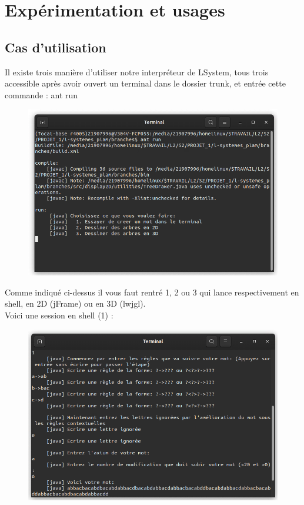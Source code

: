 \documentclass[a4paper,12pt]{article}
\begin{document}
\newpage
\section{Expérimentation et usages}

\subsection{Cas d'utilisation}

Il existe trois manière d'utiliser notre interpréteur de LSystem, tous trois accessible après avoir ouvert un terminal dans le dossier trunk, et entrée cette commande : ant run
\begin{figure}[h]
\centering
\includegraphics[scale=0.6]{Gameplay/ant_run.png}
\end{figure}

Comme indiqué ci-dessus il vous faut rentré 1, 2 ou 3 qui lance respectivement en shell, en 2D (jFrame) ou en 3D (lwjgl).
\\
Voici une session en shell (1) :

\begin{figure}[h]
\centering
\includegraphics[scale=0.6]{Gameplay/1D_tree.png}
\end{figure}
\end{document}
